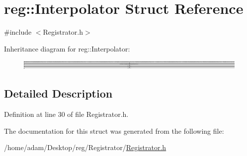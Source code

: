 \hypertarget{structreg_1_1_interpolator}{}\section{reg\+:\+:Interpolator Struct Reference}
\label{structreg_1_1_interpolator}


{\ttfamily \#include $<$Registrator.\+h$>$}

Inheritance diagram for reg\+:\+:Interpolator\+:\begin{figure}[H]
\begin{center}
\leavevmode
\includegraphics[height=0.479760cm]{structreg_1_1_interpolator}
\end{center}
\end{figure}


\subsection{Detailed Description}


Definition at line 30 of file Registrator.\+h.



The documentation for this struct was generated from the following file\+:\begin{DoxyCompactItemize}
\item 
/home/adam/\+Desktop/reg/\+Registrator/\hyperlink{_registrator_8h}{Registrator.\+h}\end{DoxyCompactItemize}
